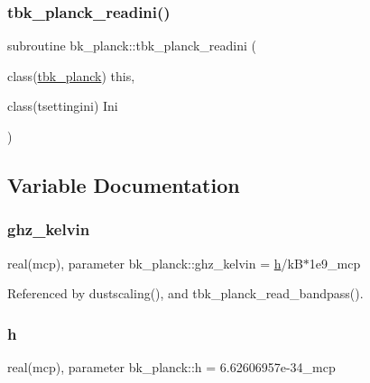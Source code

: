 \subsubsection{\texorpdfstring{tbk\+\_\+planck\+\_\+readini()}{tbk\_planck\_readini()}}
{\footnotesize\ttfamily subroutine bk\+\_\+planck\+::tbk\+\_\+planck\+\_\+readini (\begin{DoxyParamCaption}\item[{class(\mbox{\hyperlink{structbk__planck_1_1tbk__planck}{tbk\+\_\+planck}})}]{this,  }\item[{class(tsettingini)}]{Ini }\end{DoxyParamCaption})\hspace{0.3cm}{\ttfamily [private]}}



\subsection{Variable Documentation}
\mbox{\label{namespacebk__planck_a3b81f62eff019d7f94b2a4ca37efdf91}} 
\subsubsection{\texorpdfstring{ghz\+\_\+kelvin}{ghz\_kelvin}}
{\footnotesize\ttfamily real(mcp), parameter bk\+\_\+planck\+::ghz\+\_\+kelvin = \mbox{\hyperlink{namespacebk__planck_a2be53d116cb947e12107471bd0b14abd}{h}}/kB$\ast$1e9\+\_\+mcp\hspace{0.3cm}{\ttfamily [private]}}



Referenced by dustscaling(), and tbk\+\_\+planck\+\_\+read\+\_\+bandpass().

\mbox{\label{namespacebk__planck_a2be53d116cb947e12107471bd0b14abd}} 
\subsubsection{\texorpdfstring{h}{h}}
{\footnotesize\ttfamily real(mcp), parameter bk\+\_\+planck\+::h = 6.\+62606957e-\/34\+\_\+mcp\hspace{0.3cm}{\ttfamily [private]}}

